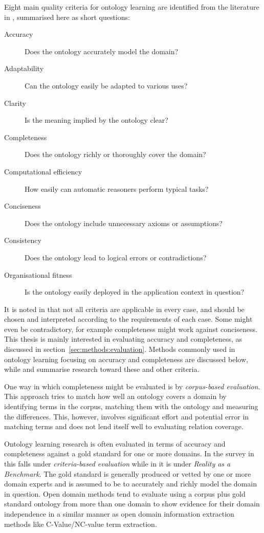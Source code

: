 \documentclass[a4paper]{report}
\begin{document}
Eight main quality criteria for ontology learning are identified from the literature in \cite{HOO2009OntEval}, summarised here as short questions:

\begin{description}
\item [Accuracy] Does the ontology accurately model the domain?
\item [Adaptability] Can the ontology easily be adapted to various uses?
\item [Clarity] Is the meaning implied by the ontology clear?
\item [Completeness] Does the ontology richly or thoroughly cover the domain?
\item [Computational efficiency] How easily can automatic reasoners perform typical tasks?
\item [Conciseness] Does the ontology include unnecessary axioms or assumptions?
\item [Consistency] Does the ontology lead to logical errors or contradictions?
\item [Organisational fitness] Is the ontology easily deployed in the application context in question?
\end{description}

It is noted in \cite{HOO2009OntEval} that not all criteria are applicable in every case, and should be chosen and interpreted according to the requirements of each case.
Some might even be contradictory, for example completeness might work against conciseness\cite{HOO2009OntEval}.
This thesis is mainly interested in evaluating accuracy and completeness, as discussed in section~\ref{sec:methods:evaluation}.
Methods commonly used in ontology learning focusing on accuracy and completeness are discussed below, while \cite{HOO2009OntEval} and \cite{ObrstEtAl07EvalOfOnt} summarise research toward these and other criteria.

One way in which completeness might be evaluated is by \emph{corpus-based evaluation}\cite{Wong11Survey}.
This approach tries to match how well an ontology covers a domain by identifying terms in the corpus, matching them with the ontology and measuring the differences.
This, however, involves significant effort and potential error in matching terms and does not lend itself well to evaluating relation coverage\cite{ObrstEtAl07EvalOfOnt}.

Ontology learning research is often evaluated in terms of accuracy and completeness against a gold standard for one or more domains\cite{Hjelm09Thesis, Zouaq11OntoCmaps, Drymonas10OntoGain, Drumond10PREHE}.
In the survey in \cite{Wong11Survey} this falls under \emph{criteria-based evaluation} while in \cite{ObrstEtAl07EvalOfOnt} it is under \emph{Reality as a Benchmark}.
The gold standard is generally produced or vetted by one or more domain experts and is assumed to be to accurately and richly model the domain in question.
Open domain methods tend to evaluate using a corpus plus gold standard ontology from more than one domain to show evidence for their domain independence in a similar manner as open domain information extraction methods like C-Value/NC-value term extraction\cite{Frantzi98CNCValue}.
\end{document}
